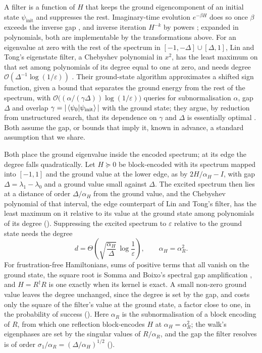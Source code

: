 A filter is a function of $H$ that keeps the ground eigencomponent of an initial state $\psi_{\mathrm{init}}$ and suppresses the rest. Imaginary-time evolution $e^{-\beta H}$ does so once $\beta$ exceeds the inverse gap \cite{motta2020qite}, and inverse iteration $H^{-k}$ by powers \cite{kyriienko2020inverse}; expanded in polynomials, both are implementable by the transformations above. For an eigenvalue at zero with the rest of the spectrum in $[-1,-\Delta]\cup[\Delta,1]$, Lin and Tong's eigenstate filter, a Chebyshev polynomial in $x^2$, has the least maximum on that set among polynomials of its degree equal to one at zero, and needs degree $\mathcal O(\Delta^{-1}\log(1/\varepsilon))$ \cite{lintong2020filtering}. Their ground-state algorithm approximates a shifted sign function, given a bound that separates the ground energy from the rest of the spectrum, with $\mathcal O\bigl((\alpha/(\gamma\Delta))\log(1/\varepsilon)\bigr)$ queries for subnormalisation $\alpha$, gap $\Delta$ and overlap $\gamma=|\braket{\psi_0|\psi_{\mathrm{init}}}|$ with the ground state; they argue, by reduction from unstructured search, that its dependence on $\gamma$ and $\Delta$ is essentially optimal \cite{lintong2020groundstate}. Both assume the gap, or bounds that imply it, known in advance, a standard assumption that we share.

Both place the ground eigenvalue inside the encoded spectrum; at its edge the degree falls quadratically. Let $H\succeq0$ be block-encoded with its spectrum mapped into $[-1,1]$ and the ground value at the lower edge, as by $2H/\alpha_H-I$, with gap $\Delta=\lambda_1-\lambda_0$ and a ground value small against $\Delta$. The excited spectrum then lies at a distance of order $\Delta/\alpha_H$ from the ground value, and the Chebyshev polynomial of that interval, the edge counterpart of Lin and Tong's filter, has the least maximum on it relative to its value at the ground state among polynomials of its degree \cite{borweinerdelyi1995} (). Suppressing the excited spectrum to $\varepsilon$ relative to the ground state needs the degree
\begin{equation}
    d = \Theta\!\left(\sqrt{\frac{\alpha_H}{\Delta}}\,\log\frac{1}{\varepsilon}\right),
    \qquad
    \alpha_H = \alpha_R^2 .
    \label{eq:degree}
\end{equation}
For frustration-free Hamiltonians, sums of positive terms that all vanish on the ground state, the square root is Somma and Boixo's spectral gap amplification \cite{somma2013gap}, and $H=R^\dagger R$ is one exactly when its kernel is exact. A small non-zero ground value leaves the degree unchanged, since the degree is set by the gap, and costs only the square of the filter's value at the ground state, a factor close to one, in the probability of success (). Here $\alpha_R$ is the subnormalisation of a block encoding of $R$, from which one reflection block-encodes $H$ at $\alpha_H=\alpha_R^2$; the walk's eigenphases are set by the singular values of $R/\alpha_R$, and the gap the filter resolves is of order $\sigma_1/\alpha_R=(\Delta/\alpha_H)^{1/2}$ ().

